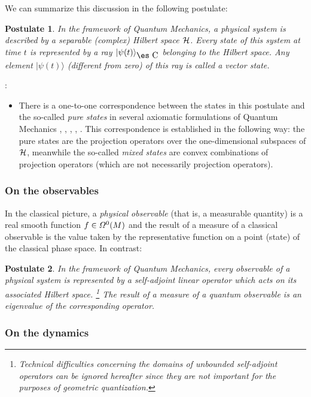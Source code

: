 \documentclass[12pt]{article}
\theoremstyle{plain}
\newtheorem{post}{Postulate}
\def\H{{\cal H}}
\def\Complex{\mbox{\es C}}
\begin{document}
We can summarize this discussion in the following postulate:

\begin{post}
In the framework of Quantum Mechanics, a physical system is described by
a
{\it separable (complex) Hilbert space} $\H$.
Every state of this system at time $t$ is represented by a
{\it ray} $|\psi (t) \rangle_{\Complex}$ belonging to the Hilbert space.
Any element $|\psi (t) \rangle $ (different from zero) of this ray is
called a {\rm vector state}.
\label{pos1}
\end{post}
:
\begin{itemize}
\item
There is a one-to-one correspondence between
the states in this postulate and the so-called
{\it pure states} in several axiomatic formulations of Quantum Mechanics
\cite{Mk-mfqm}, \cite{Mo-qmdo}, \cite{Se-pgqm}, \cite{Vn-mfqm},
\cite{Wl-tgqm}.
This correspondence is established in the following way:
the pure states are the projection operators over the one-dimensional
subspaces of $\H$,
meanwhile the so-called {\it mixed states} are convex combinations of
projection operators
(which are not necessarily  projection operators).
\end{itemize}


\subsubsection{On the observables}


In the classical picture, a {\it physical observable}
(that is, a measurable quantity) is a real smooth function
$f \in {\mit\Omega}^0(M)$ and the result of
a measure of a classical observable is the value taken by the
representative
function on a point (state) of the classical phase space.
In contrast:

\begin{post}
In the framework of Quantum Mechanics,
every observable of a physical system is represented by a
{\it self-adjoint linear operator} which acts on its associated Hilbert
space.%
\footnote{
Technical difficulties concerning the domains of unbounded self-adjoint
operators
can be ignored hereafter since they are not important
for the purposes of geometric quantization.
}
The result of a measure of a quantum observable
is an eigenvalue of the corresponding operator.
\label{pos2}
\end{post}


\subsubsection{On the dynamics}
\end{document}
